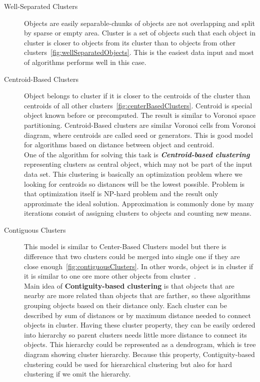 \begin{description}
\item[Well-Separated Clusters] Objects are easily separable-chunks of objects are not overlapping and split by sparse or empty area. Cluster is a set of objects such that each object in cluster is closer to objects from its cluster than to objects from other clusters~\autoref{fig:wellSeparatedObjects}. This is the easiest data input and most of algorithms performs well in this case.

\item[Centroid-Based Clusters] Object belongs to cluster if it is closer to the centroids of the cluster than centroids of all other clusters~\autoref{fig:centerBasedClusters}. Centroid is special object known before or precomputed. The result is similar to Voronoi space partitioning. Centroid-Based clusters are similar Voronoi cells from Voronoi diagram, where centroids are called seed or generators. This is good model for algorithms based on distance between object and centroid. \\
One of the algorithm for solving this task is \textit{\textbf{Centroid-based clustering}} representing clusters as central object, which may not be part of the input data set. This clustering is basically an optimization problem where we looking for centroids so distances will be the lowest possible. Problem is that optimization itself is NP-hard problem and the result only approximate the ideal solution. Approximation is commonly done by many iterations consist of assigning clusters to objects and counting new means.

\item[Contiguous Clusters] This model is similar to Center-Based Clusters model but there is difference that two clusters could be merged into single one if they are close enough~\autoref{fig:contiguousClusters}. In other words, object is in cluster if it is similar to one ore more other objects from cluster~\cite{Tan05}.\\
Main idea of \textbf{Contiguity-based clustering} is that objects that are nearby are more related than objects that are farther, so these algorithms grouping objects based on their distance only. Each cluster can be described by sum of distances or by maximum distance needed to connect objects in cluster. Having these cluster property, they can be easily ordered into hierarchy so parent clusters needs little more distance to connect its objects. This hierarchy could be represented as a dendrogram, which is tree diagram showing cluster hierarchy. Because this property, Contiguity-based clustering could be used for hierarchical clustering but also for hard clustering if we omit the hierarchy.\\


\end{description}
